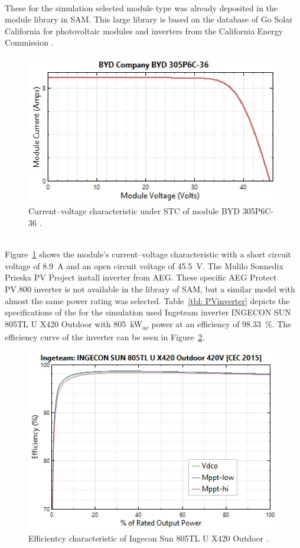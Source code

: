\documentclass[Master,MEE,english]{twbook}%
\begin{document}
\\
These for the simulation selected module type was already deposited in the module library in SAM. This large library is based on the database of Go Solar California for photovoltaic modules and inverters from the California Energy Commission \cite{NREL2015g}.\\
\begin{figure}[htbp]  
\centering
\includegraphics[width=0.70\linewidth]{FIG/PVModuleVA}
\caption[Current–voltage characteristic under STC of module BYD 305P6C-36.]{Current–voltage characteristic under STC of module BYD 305P6C-36 \cite{NREL2015g}.}\label{PVModuleVA}
\end{figure}
\\
Figure~\ref{PVModuleVA} shows the module’s current–voltage characteristic with a short circuit voltage of 8.9~A and an open circuit voltage of 45.5~V.\newpage\noindent
The Mulilo Sonnedix Prieska PV Project install inverter from AEG. These specific AEG Protect PV.800 inverter is not available in the library of SAM, but a similar model with almost the same power rating was selected. Table~\ref{tbl: PVinverter} depicts the specifications of the for the simulation used Ingeteam inverter INGECON SUN 805TL U X420 Outdoor with 805~kW\textsubscript{ac} power at an efficiency of 98.33~\%. The efficiency curve of the inverter can be seen in Figure~\ref{InverterEfficiencyCurve}. \\
\begin{figure}[htbp]  
\centering
\includegraphics[width=0.75\linewidth]{FIG/InverterEfficiencyCurve}
\caption[Efficientcy characteristic of Ingecon Sun 805TL U X420 Outdoor.]{Efficientcy characteristic of Ingecon Sun 805TL U X420 Outdoor \cite{IngeteamINC.2015,NREL2015g}.}\label{InverterEfficiencyCurve}
\end{figure}
\end{document}
